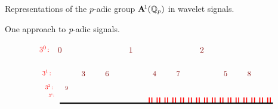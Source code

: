 \documentclass[letterpaper,11pt, reqno]{amsart}
\newtheorem{monodromy theorem}{Monodromy Theorem}[subsection]
\newtheorem{wild conjecture}[theorem]{Wild Conjecture}
\newtheorem{research objectives}{Research objectives}[subsection]
\newtheorem{research question}[theorem]{Research questions}
\newtheorem{aside question}[theorem]{Aside question}
\newtheorem{audio example}[theorem]{\loudspeaker[3] Example}
\newtheorem{blank remark}[theorem]{}
\newtheorem{terminology and comment}[theorem]{Terminology and comment}
\newtheorem{purity hypothesis}[theorem]{Purity hypothesis}
\newtheorem{corollary of the purity hypothesis}[theorem]{Corollary of the purity hypothesis}
\numberwithin{equation}{theorem}
\begin{document}
\begin{section}{Representations of the $p$-adic group $\bold{A}^{\!1}(\mathbb{Q}_{p})$ in wavelet signals.}
\begin{subsection}{One approach to {\em p}-adic signals.}
\begin{figure}[ht]
$$\begin{tikzpicture}
	\draw[red, very thick] (11/3+1/9,0) -- (11/3+1/9,.25);
	\draw[red, very thick] (11/3+2/9,0) -- (11/3+2/9,.25);
	\draw[red, very thick] (12/3+1/9,0) -- (12/3+1/9,.25);
	\draw[red, very thick] (12/3+2/9,0) -- (12/3+2/9,.25);
	\draw[red, very thick] (13/3+1/9,0) -- (13/3+1/9,.25);
	\draw[red, very thick] (13/3+2/9,0) -- (13/3+2/9,.25);
	\draw[red, very thick] (14/3+1/9,0) -- (14/3+1/9,.25);
	\draw[red, very thick] (14/3+2/9,0) -- (14/3+2/9,.25);
	\draw[red, very thick] (15/3+1/9,0) -- (15/3+1/9,.25);
	\draw[red, very thick] (15/3+2/9,0) -- (15/3+2/9,.25);
	\draw[red, very thick] (16/3+1/9,0) -- (16/3+1/9,.25);
	\draw[red, very thick] (16/3+2/9,0) -- (16/3+2/9,.25);
	\draw[red, very thick] (17/3+1/9,0) -- (17/3+1/9,.25);
	\draw[red, very thick] (17/3+2/9,0) -- (17/3+2/9,.25);
	\draw[red, very thick] (18/3+1/9,0) -- (18/3+1/9,.25);
	\draw[red, very thick] (18/3+2/9,0) -- (18/3+2/9,.25);
	\draw[red, very thick] (19/3+1/9,0) -- (19/3+1/9,.25);
	\draw[red, very thick] (19/3+2/9,0) -- (19/3+2/9,.25);
	\draw[red, very thick] (20/3+1/9,0) -- (20/3+1/9,.25);
	\draw[red, very thick] (20/3+2/9,0) -- (20/3+2/9,.25);
	\draw[red, very thick] (21/3+1/9,0) -- (21/3+1/9,.25);
	\draw[red, very thick] (21/3+2/9,0) -- (21/3+2/9,.25);
	\draw[red, very thick] (22/3+1/9,0) -- (22/3+1/9,.25);
	\draw[red, very thick] (22/3+2/9,0) -- (22/3+2/9,.25);
	\draw[red, very thick] (23/3+1/9,0) -- (23/3+1/9,.25);
	\draw[red, very thick] (23/3+2/9,0) -- (23/3+2/9,.25);
	\draw[red, very thick] (24/3+1/9,0) -- (24/3+1/9,.25);
	\draw[red, very thick] (24/3+2/9,0) -- (24/3+2/9,.25);
	\draw[red, very thick] (25/3+1/9,0) -- (25/3+1/9,.25);
	\draw[red, very thick] (25/3+2/9,0) -- (25/3+2/9,.25);
	\draw[red, very thick] (26/3+1/9,0) -- (26/3+1/9,.25);
	\draw[red, very thick] (26/3+2/9,0) -- (26/3+2/9,.25);
	\draw[black, ultra thick] (0,0) -- (9,0);
	\node[red] at (-.65,2.3) {\scalebox{.9}{$3^0\!:$}};
	\node[red] at (-.55,1.3) {\scalebox{.8}{$3^1\!:$}};
	\node[red] at (-.45,.7) {\scalebox{.7}{$3^2\!:$}};
	\node[red] at (-.35,.35) {\scalebox{.5}{$3^3\!:$}};
	\node[red!50!black!100] at (0,2.25) {\scalebox{1}{$0$}};
	\node[red!50!black!100] at (3,2.25) {\scalebox{1}{$1$}};
	\node[red!50!black!100] at (6,2.25) {\scalebox{1}{$2$}};
	\node[red!50!black!100] at (1,1.25) {\scalebox{.9}{$3$}};
	\node[red!50!black!100] at (2,1.25) {\scalebox{.9}{$6$}};
	\node[red!50!black!100] at (4,1.25) {\scalebox{.9}{$4$}};
	\node[red!50!black!100] at (5,1.25) {\scalebox{.9}{$7$}};
	\node[red!50!black!100] at (7,1.25) {\scalebox{.9}{$5$}};
	\node[red!50!black!100] at (8,1.25) {\scalebox{.9}{$8$}};
	\node[red!50!black!100] at (1/3,.65) {\scalebox{.7}{$9\ $}};

\end{tikzpicture}$$
\end{figure}
\end{subsection}
\end{section}
\end{document}
